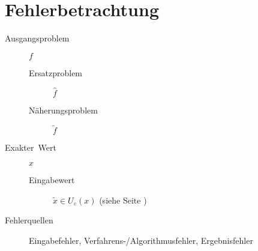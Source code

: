 \chapter{Fehlerbetrachtung}
\begin{description}
  \item [{Ausgangsproblem}]
	$f$
	\begin{description}
	  \item [{Ersatzproblem}] $\hat{f}$
	  \item [{Näherungsproblem}] $\tilde{f}$
	\end{description}
  \item [{Exakter~Wert}]
	$x$
	\begin{description}
	  \item [{Eingabewert}] $\tilde{x}\in U_{\varepsilon}(x)$ (siehe Seite \pageref{sub:Epsilon-Umgebung})
	\end{description}
  \item [{Fehlerquellen}]
	Eingabefehler, Verfahrens-/Algorithmusfehler, Ergebnisfehler


\end{description}
